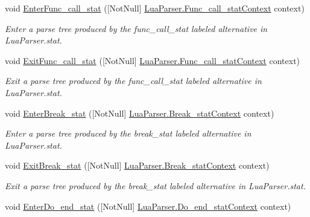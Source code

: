 \begin{DoxyCompactItemize}
void \mbox{\hyperlink{interfacezlua_1_1_i_lua_listener_a082ec71bf7dc3bee6dd365c9a56ee59c}{Enter\+Func\+\_\+call\+\_\+stat}} (\mbox{[}Not\+Null\mbox{]} \mbox{\hyperlink{classzlua_1_1_lua_parser_1_1_func__call__stat_context}{Lua\+Parser.\+Func\+\_\+call\+\_\+stat\+Context}} context)
\begin{DoxyCompactList}\small\item\em Enter a parse tree produced by the {\ttfamily func\+\_\+call\+\_\+stat} labeled alternative in Lua\+Parser.\+stat. \end{DoxyCompactList}\item 
void \mbox{\hyperlink{interfacezlua_1_1_i_lua_listener_ab9aba8c96896e86ec76ca5a87c5d2f25}{Exit\+Func\+\_\+call\+\_\+stat}} (\mbox{[}Not\+Null\mbox{]} \mbox{\hyperlink{classzlua_1_1_lua_parser_1_1_func__call__stat_context}{Lua\+Parser.\+Func\+\_\+call\+\_\+stat\+Context}} context)
\begin{DoxyCompactList}\small\item\em Exit a parse tree produced by the {\ttfamily func\+\_\+call\+\_\+stat} labeled alternative in Lua\+Parser.\+stat. \end{DoxyCompactList}\item 
void \mbox{\hyperlink{interfacezlua_1_1_i_lua_listener_aa77c8634ee96ca2069ceb9e93b2bae57}{Enter\+Break\+\_\+stat}} (\mbox{[}Not\+Null\mbox{]} \mbox{\hyperlink{classzlua_1_1_lua_parser_1_1_break__stat_context}{Lua\+Parser.\+Break\+\_\+stat\+Context}} context)
\begin{DoxyCompactList}\small\item\em Enter a parse tree produced by the {\ttfamily break\+\_\+stat} labeled alternative in Lua\+Parser.\+stat. \end{DoxyCompactList}\item 
void \mbox{\hyperlink{interfacezlua_1_1_i_lua_listener_a869e5a8abc4ddac071073a74bf09b6c5}{Exit\+Break\+\_\+stat}} (\mbox{[}Not\+Null\mbox{]} \mbox{\hyperlink{classzlua_1_1_lua_parser_1_1_break__stat_context}{Lua\+Parser.\+Break\+\_\+stat\+Context}} context)
\begin{DoxyCompactList}\small\item\em Exit a parse tree produced by the {\ttfamily break\+\_\+stat} labeled alternative in Lua\+Parser.\+stat. \end{DoxyCompactList}\item 
void \mbox{\hyperlink{interfacezlua_1_1_i_lua_listener_ad561e0f5feb33ca80ba5202ab0511bab}{Enter\+Do\+\_\+end\+\_\+stat}} (\mbox{[}Not\+Null\mbox{]} \mbox{\hyperlink{classzlua_1_1_lua_parser_1_1_do__end__stat_context}{Lua\+Parser.\+Do\+\_\+end\+\_\+stat\+Context}} context)

\end{DoxyCompactItemize}
